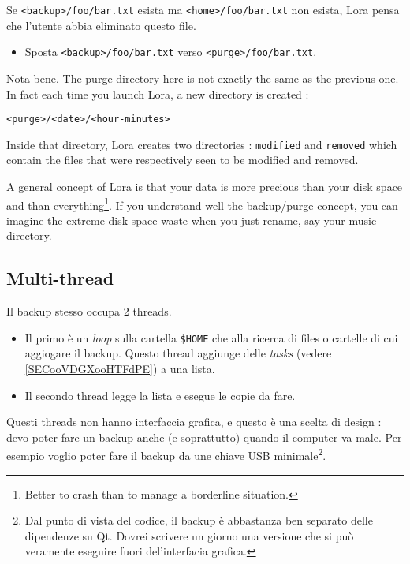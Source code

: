 \documentclass[a4paper,12pt]{article}
\newcommand{\info}[1]{\texttt{#1}}
\begin{document}
Se \info{<backup>/foo/bar.txt} esista ma \info{<home>/foo/bar.txt} non esista, Lora pensa che l'utente abbia eliminato questo file.
\begin{itemize}
    \item 
        Sposta \info{<backup>/foo/bar.txt} verso \info{<purge>/foo/bar.txt}.
\end{itemize}

Nota bene. The purge directory here is not exactly the same as the previous one. In fact each time you launch Lora, a new directory is created :
\begin{center}
    \info{<purge>/<date>/<hour-minutes>}
\end{center}
Inside that directory, Lora creates two directories : \info{modified} and \info{removed} which contain the files that were respectively seen to be modified and removed.

A general concept of Lora is that your data is more precious than your disk space and than everything\footnote{Better to crash than to manage a borderline situation.}. If you understand well the backup/purge concept, you can imagine the extreme disk space waste when you just rename, say your music directory.

\subsection{Multi-thread}

Il backup stesso occupa 2 threads.
\begin{itemize}
    \item Il primo è un \emph{loop} sulla cartella \info{\$HOME} che alla ricerca di files o cartelle di cui aggiogare il backup. Questo thread aggiunge delle \emph{tasks} (vedere \ref{SECooVDGXooHTFdPE}) a una lista.
    \item Il secondo thread legge la lista e esegue le copie da fare.
\end{itemize}
Questi threads non hanno interfaccia grafica, e questo è una scelta di design : devo poter fare un backup anche (e soprattutto) quando il computer va male. Per esempio voglio poter fare il backup da une chiave USB minimale\footnote{Dal punto di vista del codice, il backup è abbastanza ben separato delle dipendenze su Qt. Dovrei scrivere un giorno una versione che si può veramente eseguire fuori del'interfacia grafica.}.
\end{document}
